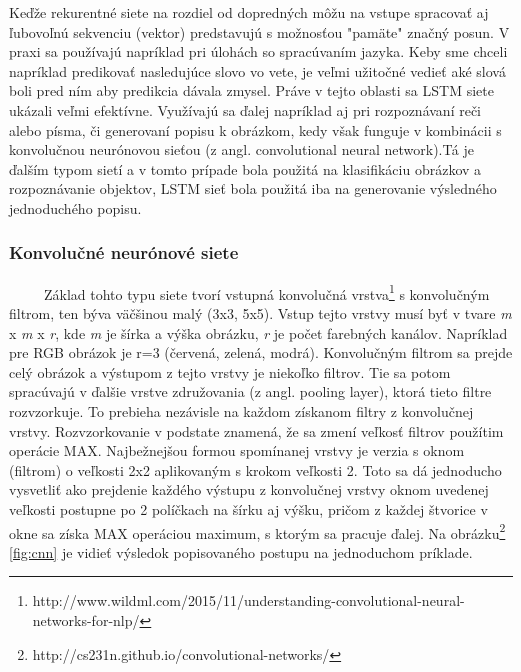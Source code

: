 Keďže rekurentné siete na rozdiel od dopredných môžu na vstupe spracovať aj ľubovoľnú sekvenciu (vektor) predstavujú s možnosťou "pamäte" značný posun. V praxi sa používajú napríklad pri úlohách so spracúvaním jazyka. Keby sme chceli napríklad predikovať nasledujúce slovo vo vete, je veľmi užitočné vedieť aké slová boli pred ním aby predikcia dávala zmysel. Práve v tejto oblasti sa LSTM siete ukázali veľmi efektívne. Využívajú sa ďalej napríklad aj pri rozpoznávaní reči\cite{rnn_speech} alebo písma\cite{rnn_handwriting}, či generovaní popisu k obrázkom\cite{image_description}, kedy však funguje v kombinácii s konvolučnou neurónovou sieťou (z angl. convolutional neural network).Tá je ďalším typom sietí a v tomto prípade bola použitá na klasifikáciu obrázkov a rozpoznávanie objektov, LSTM sieť bola použitá iba na generovanie výsledného jednoduchého popisu.


\subsubsection{Konvolučné neurónové siete}
\
\
\
\
\
Základ tohto typu siete tvorí vstupná konvolučná vrstva\footnote{http://www.wildml.com/2015/11/understanding-convolutional-neural-networks-for-nlp/} s konvolučným filtrom, ten býva väčšinou malý (3x3, 5x5). Vstup tejto vrstvy musí byť v tvare \textit{m} x \textit{m} x \textit{r}, kde \textit{m} je šírka a výška obrázku, \textit{r} je počet farebných kanálov. Napríklad pre RGB obrázok je r=3 (červená, zelená, modrá). Konvolučným filtrom sa prejde celý obrázok a výstupom z tejto vrstvy je niekoľko filtrov. Tie sa potom spracúvajú v ďalšie vrstve združovania (z angl. pooling layer\cite{cs231n}), ktorá tieto filtre rozvzorkuje. To prebieha nezávisle na každom získanom filtry z konvolučnej vrstvy. Rozvzorkovanie v podstate znamená, že sa zmení veľkosť filtrov použítim operácie MAX. Najbežnejšou formou spomínanej vrstvy je verzia s oknom (filtrom) o veľkosti 2x2 aplikovaným s krokom veľkosti 2. Toto sa dá jednoducho vysvetliť ako prejdenie každého výstupu z konvolučnej vrstvy oknom uvedenej veľkosti postupne po 2 políčkach na šírku aj výšku, pričom z každej štvorice v okne sa získa MAX operáciou maximum, s ktorým sa pracuje ďalej. Na  obrázku\footnote{http://cs231n.github.io/convolutional-networks/} \ref{fig:cnn} je vidieť výsledok popisovaného postupu na jednoduchom príklade.
	
